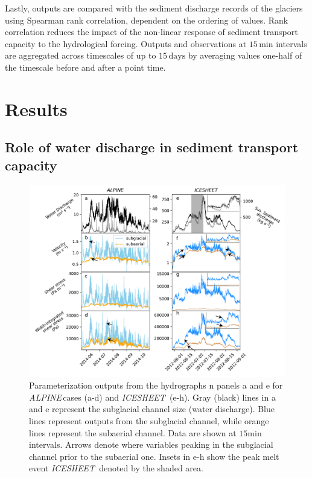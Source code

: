 \documentclass[draft]{agujournal2019}
\newcommand{\alpine}{\textit{ALPINE}\,}
\newcommand{\icesheet}{\textit{ICESHEET}\,}
\newcommand{\unit}[1]{$\mathrm{#1}$}
\begin{document}
Lastly, outputs are compared with the sediment discharge records of the glaciers using Spearman rank correlation, dependent on the ordering of values.
Rank correlation reduces the impact of the non-linear response of sediment transport capacity to the hydrological forcing.
Outputs and observations at $15$\,\unit{min} intervals are aggregated across timescales of up to $15$\,\unit{days} by averaging values one-half of the timescale before and after a point time.

\section{Results}

\subsection{Role of water discharge in sediment transport capacity}
\begin{figure}[h]
  \centering
  \includegraphics[width=0.9\linewidth]{Fig2.pdf}
  \caption{Parameterization outputs from the hydrographs n panels a and e for \alpine cases (a-d) and \icesheet{} (e-h).
    Gray (black) lines in a and e represent the subglacial channel size (water discharge).
    Blue lines represent outputs from the subglacial channel, while orange lines represent the subaerial channel.
    Data are shown at $15$\unit{min} intervals.
    Arrows denote where variables peaking in the subglacial channel prior to the subaerial one.
    Insets in e-h show the  peak melt event \icesheet{} denoted by the shaded area.
  }
  \label{fig:model_outs}
\end{figure}
\end{document}
